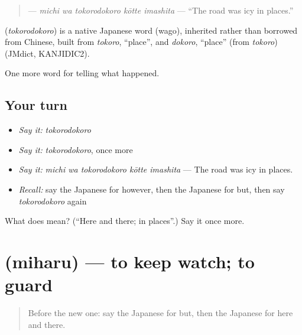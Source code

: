 \begin{quote}
\textbf{  } — \emph{michi wa tokorodokoro kōtte imashita} — \textquotedblleft{}The road was icy in places.\textquotedblright{}
\end{quote}

\begin{cousinweb}
\textbf{} (\emph{tokorodokoro}) is a native Japanese word (wago), inherited rather than borrowed from Chinese, built from \emph{tokoro}, \textquotedblleft{}place\textquotedblright{}, and \emph{dokoro}, \textquotedblleft{}place\textquotedblright{} (from \emph{tokoro}) (JMdict, KANJIDIC2).
\end{cousinweb}

\begin{grammarlens}[title={What you've built}]
One more word for telling what happened.
\end{grammarlens}

\subsection*{Your turn}
\begin{itemize}
\raggedright
  \item \emph{Say it:} \emph{tokorodokoro}
  \item \emph{Say it:} \emph{tokorodokoro}, once more
  \item \emph{Say it:} \emph{michi wa tokorodokoro kōtte imashita} — The road was icy in places.
  \item \emph{Recall:} say the Japanese for however, then the Japanese for but, then say \emph{tokorodokoro} again
\end{itemize}

\begin{tcolorbox}[breakable,colback=teal!4,colframe=teal!35!black,title={Before you move on}]
What does  mean? (\textquotedblleft{}Here and there; in places\textquotedblright{}.) Say it once more.
\end{tcolorbox}
\section[\texorpdfstring{\ja{みはる} (miharu)}{みはる (miharu)}]{ (miharu) — to keep watch; to guard}

\label{lesson:JA-C315-miharu}



\begin{quote}
Before the new one: say the Japanese for but, then the Japanese for here and there.
\end{quote}

